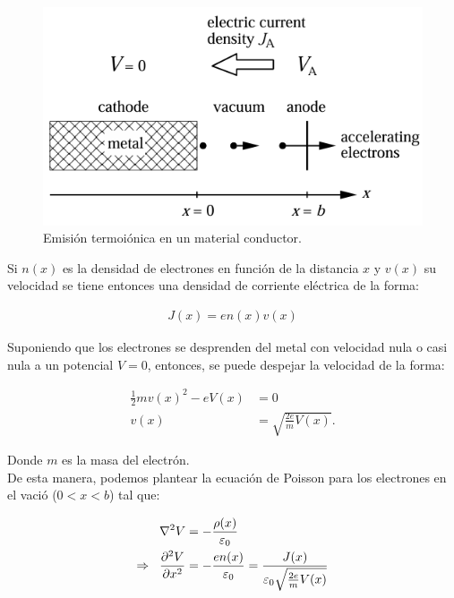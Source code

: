 \documentclass[%
 reprint,
 amsmath,amssymb,
 aps,
]{revtex4-2}
\begin{document}
\begin{figure}[H]
    \centering
    \includegraphics[width=0.8\linewidth]{../src/imagenes/Emisión termoiónica.png}
    \caption{Emisión termoiónica en un material conductor.}
    \label{em1}
\end{figure}

\vspace{0.2 cm}
Si $n(x)$ es la densidad de electrones en función de la distancia $x$ y $v(x)$ su velocidad se tiene entonces una densidad de corriente eléctrica de la forma:

\begin{align*}
    J(x) = en(x)v(x)
\end{align*}

\vspace{0.2 cm}
Suponiendo que los electrones se desprenden del metal con velocidad nula o casi nula a un potencial $V= 0$, entonces, se puede despejar la velocidad de la forma:

    \begin{align*}
        \frac{1}{2}mv(x)^{2} - eV(x) &= 0\\
        v(x) &= \sqrt{\frac{2e}{m}V(x)}.
    \end{align*}

\vspace{0.2 cm}
Donde $m$ es la masa del electrón.
\\

De esta manera, podemos plantear la ecuación de Poisson para los electrones en el vació ($0<x<b$) tal que:

\begin{align*}
    \nabla^{2}V &= -\frac{\rho (x)}{\varepsilon_{0}} \\ \Rightarrow \hspace{0.2 cm} \frac{\partial^{2}V}{\partial x^{2}} &= -\frac{en(x)}{\varepsilon_{0}} = \frac{J(x)}{\varepsilon_{0}\sqrt{\frac{2e}{m}V(x)}}
\end{align*}
\end{document}
